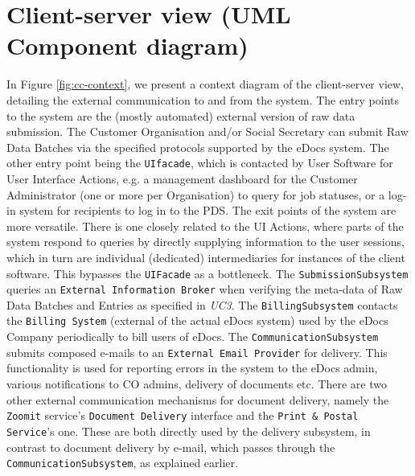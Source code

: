 \section{Client-server view (UML Component diagram)}\label{sec:client-server}
In Figure \ref{fig:cc-context}, we present a context diagram of the client-server view, detailing the external communication to and from the system. The entry points to the system are the (mostly automated) external version of raw data submission. The Customer Organisation and/or Social Secretary can submit Raw Data Batches via the specified protocols supported by the eDocs system.
The other entry point being the \texttt{UIfacade}, which is contacted by User Software for User Interface Actions, e.g. a management dashboard for the Customer Administrator (one or more per Organisation) to query for job statuses, or a log-in system for recipients to log in to the PDS.
The exit points of the system are more versatile. There is one closely related to the UI Actions, where parts of the system respond to queries by directly supplying information to the user sessions, which in turn are individual (dedicated) intermediaries for instances of the client software. This bypasses the \texttt{UIFacade} as a bottleneck.
The \texttt{SubmissionSubsystem} queries an \texttt{External Information Broker} when verifying the meta-data of Raw Data Batches and Entries as specified in \emph{UC3}.
The \texttt{BillingSubsystem} contacts the \texttt{Billing System} (external of the actual eDocs system) used by the eDocs Company periodically to bill users of eDocs.
The \texttt{CommunicationSubsystem} submits composed e-mails to an \texttt{External Email Provider} for delivery. This functionality is used for reporting errors in the system to the eDocs admin, various notifications to CO admins, delivery of documents etc.
There are two other external communication mechanisms for document delivery, namely the \texttt{Zoomit} service's \texttt{Document Delivery} interface and the \texttt{Print \& Postal Service}'s one. These are both directly used by the delivery subsystem, in contrast to document delivery by e-mail, which passes through the \texttt{CommunicationSubsystem}, as explained earlier.

